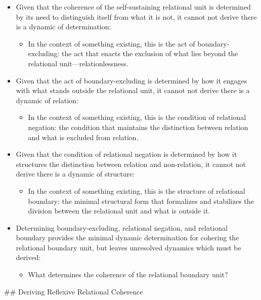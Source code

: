 \documentclass[11pt]{article}
\begin{document}
\begin{itemize}
\item Given that the coherence of the self-sustaining relational unit is determined by its need to distinguish itself from what it is not, it cannot not derive there is a dynamic of determination:

\begin{itemize}
\item In the context of something existing, this is the act of boundary-excluding: the act that enacts the exclusion of what lies beyond the relational unit—relationlessness.
\end{itemize}

\item Given that the act of boundary-excluding is determined by how it engages with what stands outside the relational unit, it cannot not derive there is a dynamic of relation:

\begin{itemize}
\item In the context of something existing, this is the condition of relational negation: the condition that maintains the distinction between relation and what is excluded from relation.
\end{itemize}

\item Given that the condition of relational negation is determined by how it structures the distinction between relation and non-relation, it cannot not derive there is a dynamic of structure:

\begin{itemize}
\item In the context of something existing, this is the structure of relational boundary: the minimal structural form that formalizes and stabilizes the division between the relational unit and what is outside it.
\end{itemize}

\item Determining boundary-excluding, relational negation, and relational boundary provides the minimal dynamic determination for cohering the relational boundary unit, but leaves unresolved dynamics which must be derived:

\begin{itemize}
\item What determines the coherence of the relational boundary unit?
\end{itemize}
\end{itemize}
\#\# Deriving Reflexive Relational Coherence
\end{document}
